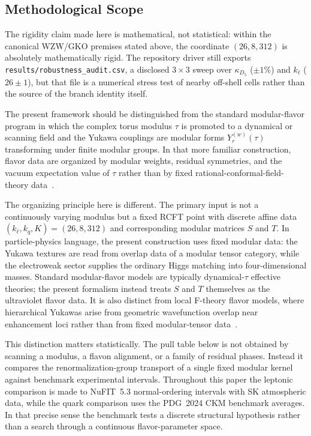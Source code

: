 \documentclass[11pt]{article}
\begin{document}
\subsection*{Methodological Scope}

The rigidity claim made here is mathematical, not statistical: within the canonical WZW/GKO premises stated above, the coordinate $(26,8,312)$ is absolutely mathematically rigid. The repository driver still exports \texttt{results/robustness\_audit.csv}, a disclosed $3\times 3$ sweep over $\kappa_{D_5}$ ($\pm1\%$) and $k_{\ell}$ ($26\pm1$), but that file is a numerical stress test of nearby off-shell cells rather than the source of the branch identity itself.

The present framework should be distinguished from the standard modular-flavor program in which the complex torus modulus $\tau$ is promoted to a dynamical or scanning field and the Yukawa couplings are modular forms $Y_r^{(w)}(\tau)$ transforming under finite modular groups. In that more familiar construction, flavor data are organized by modular weights, residual symmetries, and the vacuum expectation value of $\tau$ rather than by fixed rational-conformal-field-theory data~\cite{feruglio2017,kobayashi2018,criado2018,kobayashi2017}.

The organizing principle here is different. The primary input is not a continuously varying modulus but a fixed RCFT point with discrete affine data $(k_{\ell},k_q,K)=(26,8,312)$ and corresponding modular matrices $S$ and $T$. In particle-physics language, the present construction uses fixed modular data: the Yukawa textures are read from overlap data of a modular tensor category, while the electroweak sector supplies the ordinary Higgs matching into four-dimensional masses. Standard modular-flavor models are typically dynamical-$\tau$ effective theories; the present formalism instead treats $S$ and $T$ themselves as the ultraviolet flavor data. It is also distinct from local F-theory flavor models, where hierarchical Yukawas arise from geometric wavefunction overlap near enhancement loci rather than from fixed modular-tensor data~\cite{heckman2010,bouchard2010}.

This distinction matters statistically. The pull table below is not obtained by scanning a modulus, a flavon alignment, or a family of residual phases. Instead it compares the renormalization-group transport of a single fixed modular kernel against benchmark experimental intervals. Throughout this paper the leptonic comparison is made to NuFIT~5.3 normal-ordering intervals with SK atmospheric data, while the quark comparison uses the PDG~2024 CKM benchmark averages. In that precise sense the benchmark tests a discrete structural hypothesis rather than a search through a continuous flavor-parameter space.
\end{document}
